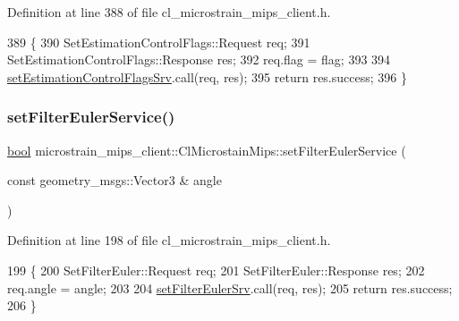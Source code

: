 Definition at line 388 of file cl\+\_\+microstrain\+\_\+mips\+\_\+client.\+h.


\begin{DoxyCode}
389     \{
390         SetEstimationControlFlags::Request req;
391         SetEstimationControlFlags::Response res;
392         req.flag = flag;
393 
394         \hyperlink{classmicrostrain__mips__client_1_1ClMicrostainMips_a13132b27dff7c8527c42e91dc7dccb39}{setEstimationControlFlagsSrv}.call(req, res);
395         \textcolor{keywordflow}{return} res.success;
396     \}
\end{DoxyCode}
\mbox{\label{classmicrostrain__mips__client_1_1ClMicrostainMips_a271f7775207215efe1c9ed3744189212}} 
\subsubsection{\texorpdfstring{set\+Filter\+Euler\+Service()}{setFilterEulerService()}}
{\footnotesize\ttfamily \hyperlink{classbool}{bool} microstrain\+\_\+mips\+\_\+client\+::\+Cl\+Microstain\+Mips\+::set\+Filter\+Euler\+Service (\begin{DoxyParamCaption}\item[{const geometry\+\_\+msgs\+::\+Vector3 \&}]{angle }\end{DoxyParamCaption})\hspace{0.3cm}{\ttfamily [inline]}}



Definition at line 198 of file cl\+\_\+microstrain\+\_\+mips\+\_\+client.\+h.


\begin{DoxyCode}
199     \{
200         SetFilterEuler::Request req;
201         SetFilterEuler::Response res;
202         req.angle = angle;
203 
204         \hyperlink{classmicrostrain__mips__client_1_1ClMicrostainMips_ac6dd19db8020f5006b362cfc2196138c}{setFilterEulerSrv}.call(req, res);
205         \textcolor{keywordflow}{return} res.success;
206     \}
\end{DoxyCode}
\mbox{\label{classmicrostrain__mips__client_1_1ClMicrostainMips_a3626f73ce1077069e7e1cd464673ed40}} 
